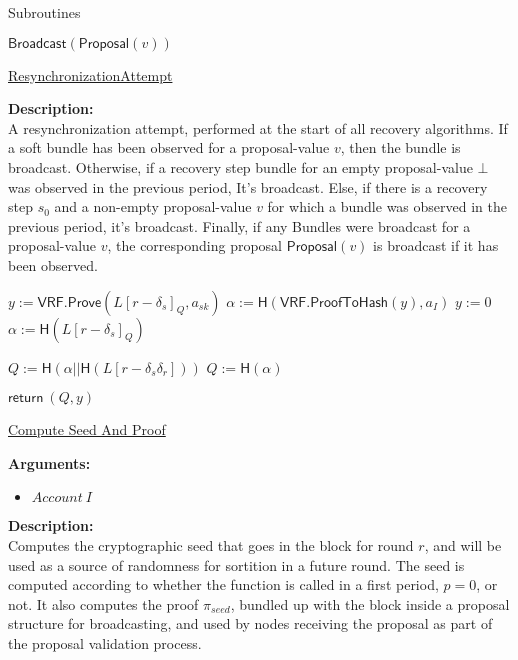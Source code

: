 \documentclass[10pt,a4paper]{article}
\begin{document}
\begin{section}{Subroutines}
\begin{algorithm}[H]
\begin{algorithmic}[1]
        \State $\mathsf{Broadcast}(\mathsf{Proposal}(v))$
    \EndIf

    \EndFunction
    \end{algorithmic}
    \caption{\underline{ResynchronizationAttempt}}
\end{algorithm}

\noindent \textbf{Description:}\\
A resynchronization attempt, performed at the start of all recovery algorithms.
If a soft bundle has been observed for a proposal-value $v$, then the bundle is broadcast.
Otherwise, if a recovery step bundle for an empty proposal-value $\bot$ was observed in the previous period,
It's broadcast.
Else, if there is a recovery step $s_0$ and a non-empty proposal-value $v$ for which a bundle was observed in the previous
period, it's broadcast.
Finally, if any Bundles were broadcast for a proposal-value $v$, the corresponding proposal $\mathsf{Proposal}(v)$ is broadcast
if it has been observed.


\begin{algorithm}[H]\label{algo:compute-seed}
    \begin{algorithmic}[1]
             \State $y := \mathsf{VRF.Prove}(L[r-\delta_s]_Q, a_{sk})$
             \State $\alpha := \mathsf{H}(\mathsf{VRF.ProofToHash}(y), a_I)$
        \Else
            \State $y := 0$
            \State $\alpha := \mathsf{H}(L[r-\delta_s]_Q)$
        \EndIf

            \State $Q := \mathsf{H}(\alpha||\mathsf{H}(L[r-\delta_s\delta_r]))$
        \Else
            \State $Q := \mathsf{H}(\alpha)$
        \EndIf

         \State $\mathsf{return} \ (Q, y)$
    \EndFunction
    \end{algorithmic}
    \caption{\underline{Compute Seed And Proof}}
\end{algorithm}


\noindent \textbf{Arguments:}
\begin{itemize}
    \item $Account \ I$
  \end{itemize}


\noindent \textbf{Description:}\\ Computes the cryptographic seed that goes in the block for round $r$,
and will be used as a source of randomness for sortition in a future round.
The seed is computed according to whether the function is called in a first period, $p = 0$, or not.
It also computes the proof $\pi_{seed}$, bundled up with the block inside a proposal structure for broadcasting, 
and used by nodes receiving the proposal as part of the proposal validation process.



\end{section}
\end{document}
